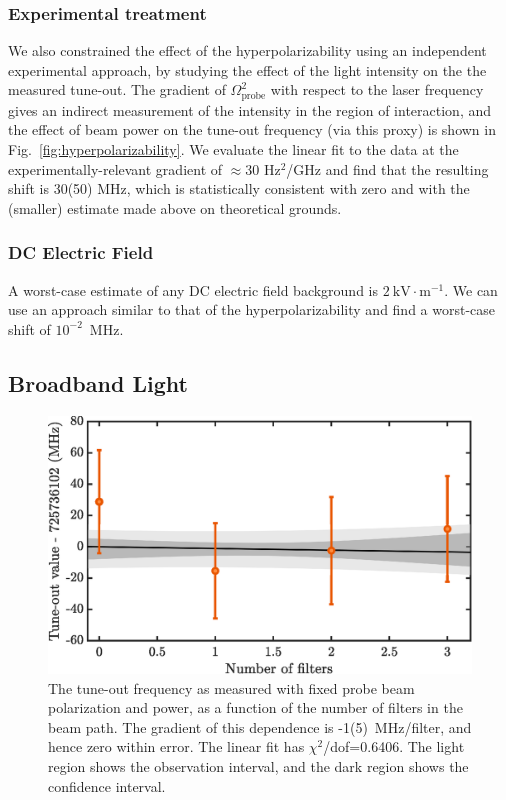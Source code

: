 \subsubsection{Experimental treatment}

	We also constrained the effect of the hyperpolarizability using an independent experimental approach, by studying the effect of the light intensity on the the measured tune-out. 
	The gradient of \(\Omega_{\text{probe}}^2\) with respect to the laser frequency gives an indirect measurement of the intensity in the region of interaction, and the effect of beam power on the tune-out frequency (via this proxy) is shown in Fig.~\ref{fig:hyperpolarizability}.
	We evaluate the linear fit to the data at the experimentally-relevant gradient of $\approx 30$ Hz$^2$/GHz and find that the resulting shift is 30(50) MHz, which is statistically consistent with zero and with the (smaller) estimate made above on theoretical grounds.
	

\subsubsection{DC Electric Field}

	A worst-case estimate of any DC electric field background is $2~\text{kV}\cdot\text{m}^{-1}$. 
	We can use an approach similar to that of the hyperpolarizability  and find a worst-case shift of \(10^{-2}\)~MHz.

\subsection{Broadband Light}
	\begin{figure}
	    \centering
	    \includegraphics[width=\textwidth]{fig/tuneout/filt_dep_new}
	    \caption{The tune-out frequency as measured with fixed probe beam polarization and power, as a function of the number of filters in the beam path. The gradient of this dependence is -1(5)~MHz/filter, and hence zero within error. The linear fit has $\chi^2$/dof=0.6406. The light region shows the observation interval, and the dark region shows the confidence interval.
	    }
	    \label{fig:broadband light dependence}
	\end{figure}


